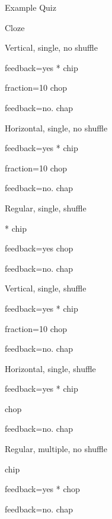 \documentclass{article}
\begin{document}
\begin{quiz}[sanction=40]{Example Quiz}
\begin{cloze}{Cloze}
\begin{multi}[shuffle=false,vertical]
Vertical, single, no shuffle
\item[feedback={yes}]* chip
\item[fraction=10] chop
\item[feedback={no.}] chap
\end{multi}

\begin{multi}[sanction=10,shuffle=false,horizontal]
Horizontal, single, no shuffle
\item[feedback={yes}]* chip
\item[fraction=10] chop
\item[feedback={no.}] chap
\end{multi}

\begin{multi}[shuffle=true]
	Regular, single, shuffle
	\item[]* chip
	\item[feedback={yes}] chop
	\item[feedback={no.}] chap
\end{multi}

\begin{multi}[shuffle=true,vertical]
	Vertical, single, shuffle
	\item[feedback={yes}]* chip
	\item[fraction=10] chop
	\item[feedback={no.}] chap
\end{multi}

\begin{multi}[shuffle=true,horizontal]
	Horizontal, single, shuffle
	\item[feedback={yes}]* chip
	\item chop
	\item[feedback={no.}] chap
\end{multi}

\begin{multi}[multiple,shuffle=false]
	Regular, multiple, no shuffle
	\item* chip
	\item[feedback={yes}]* chop
	\item[feedback={no.}] chap
\end{multi}



\end{cloze}
\end{quiz}
\end{document}
